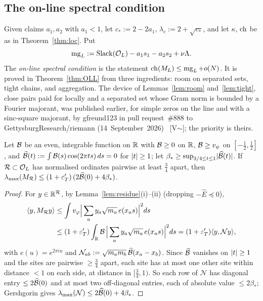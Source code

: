 \subsection{The on-line spectral condition}
Given claims $a_1,a_2$ with $a_1<1$, let $c_*:=2-2a_1$, $\lambda_c:=2+\sqrt{c_*}$, and let $\kappa$, $\operatorname{ch}$ be as in Theorem~\ref{thm:loc}. Put
\[
\operatorname{mg}_L:=\operatorname{Slack}(\mathcal O_L)-a_1s_1-a_2s_2+\nu\Lambda .
\]
The \emph{on-line spectral condition} is the statement $\operatorname{ch}(M_L)\le\operatorname{mg}_L+o(N)$. It is proved in Theorem~\ref{thm:OLL} from three
ingredients: room on separated sets, tight chains, and aggregation. The device of Lemmas~\ref{lem:room} and~\ref{lem:tight}, close pairs
paid for locally and a separated set whose Gram norm is bounded by a Fourier majorant, was published earlier, for simple zeros on the line
and with a sinc-square majorant, by \mbox{gfreund123} in pull request~\#888 to \mbox{GettysburgResearch/riemann} (14~September~2026)~\cite{Gettysburg888}
[V$\sim$]; the priority is theirs.

\begin{lemma}\label{lem:room}
Let $\mathcal B$ be an even, integrable function on $\mathbb R$ with $\mathcal B\ge0$ on $\mathbb R$, $\mathcal B\ge v_\psi$ on $[-\frac12,\frac12]$, and
$\widehat{\mathcal B}(t):=\int\mathcal B(s)\cos(2\pi ts)\,ds=0$ for $\lvert t\rvert\ge1$; let $\beta_*\ge\sup_{3/4\le t\le1}\lvert \widehat{\mathcal B}(t)\rvert$. If $\mathcal R\subset\mathcal O_L$
has normalised ordinates pairwise at least $\frac34$ apart, then
$\lambda_{\max}(M_\mathcal R)\le(1+\varepsilon'_T)\,(2\widehat{\mathcal B}(0)+4\beta_*)$.
\end{lemma}

\begin{proof}
For $y\in\mathbb R^\mathcal R$, by Lemma~\ref{lem:residue}(i)--(ii) (dropping $-\widehat E\preceq0$),
\begin{align*}
\langle y,M_\mathcal R y\rangle&\le\int v_\varphi\Big|\sum_ay_a\sqrt{m_a}\,e(x_as)\Big|^2ds\\
&\le(1+\varepsilon'_T)\int_\mathbb R\mathcal B\,\Big|\sum_ay_a\sqrt{m_a}\,e(x_as)\Big|^2ds=(1+\varepsilon'_T)\langle y,\mathcal Ny\rangle,
\end{align*}
with $e(u)=e^{2\pi iu}$ and $\mathcal N_{ab}:=\sqrt{m_am_b}\,\widehat{\mathcal B}(x_a-x_b)$. Since $\widehat{\mathcal B}$ vanishes on $\lvert t\rvert\ge1$ and the sites are
pairwise $\ge\frac34$ apart, each site has at most one other site within distance $<1$ on each side, at distance in $[\frac34,1)$. So each row of
$\mathcal N$ has diagonal entry $\le2\widehat{\mathcal B}(0)$ and at most two off-diagonal entries, each of absolute value $\le2\beta_*$; Gershgorin gives
$\lambda_{\max}(\mathcal N)\le2\widehat{\mathcal B}(0)+4\beta_*$.
\end{proof}

